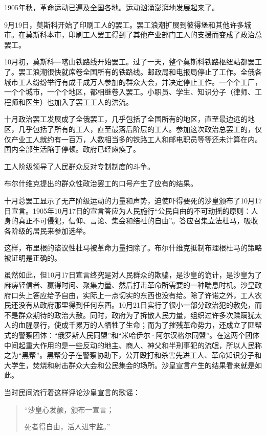 1905年秋，革命运动已遍及全国各地。运动汹涌澎湃地发展起来了。

9月19日，莫斯科开始了印刷工人的罢工。罢工浪潮扩展到彼得堡和其他许多城市。在莫斯科本市，印刷工人罢工得到了其他产业部门工人的支援而变成了政治总罢工。

10月初，莫斯科—喀山铁路线开始罢工。过了一天，整个莫斯科铁路枢纽站都罢工了。罢工浪潮很快就席卷全国所有的铁路线。邮政局和电报局停止了工作。全俄各城市工人纷纷举行有成千成万人参加的群众大会，并决定停止工作。一个个工厂，一个个城市，一个个地区，都相继卷入罢工。小职员、学生、知识分子（律师、工程师和医生）也加入了罢工工人的洪流。

十月政治罢工发展成了全俄罢工，几乎包括了全国所有的地区，直至最边远的地区，几乎包括了所有的工人，直至最落后阶层的工人。参加这次政治总罢工的，仅仅产业工人就约有一百万，人数相当多的铁路工人和邮电职员等等还未计算在内。国内全部生活陷于停顿。政府已经瘫痪了。

工人阶级领导了人民群众反对专制制度的斗争。

布尔什维克提出的群众性政治罢工的口号产生了应有的结果。

十月总罢工显示了无产阶级运动的力量和声势，迫使吓得要死的沙皇颁布了10月17日宣言。1905年10月17日的宣言答应为人民施行“公民自由的不可动摇的原则：人身的真正不可侵犯，信仰、言论、集会和结社的自由”。答应召集立法杜马，吸收各阶级的居民来参加选举。

这样，布里根的谘议性杜马被革命力量扫除了。布尔什维克抵制布理根杜马的策略被证明是正确的。

虽然如此，但10月17日宣言终究是对人民群众的欺骗，是沙皇的诡计，是沙皇为了麻痹轻信者、赢得时问、聚集力量、然后打击革命所需要的一种喘息时机。沙皇政府口头上答应给予自由，实际上一点切实的东西也没有给。除了许诺之外，工人农民还没有从政府那里得到任何东西。10月21日实行了很小一部分政治犯的赦免，而不是群众期待的政治大赦。同时，政府为了拆散人民力量，组织过许多次蹂躏犹太人的血腥暴行，使成千累万的人牺牲了生命；而为了摧残革命势力，还成立了匪帮式的警察团体：“俄罗斯人民同盟”和“米哈伊尔·阿尔汉格尔同盟”。在这两个团体中间起重大作用的是一些反动的地主、商人、神父和半刑事犯的流氓，所以人民称之为“黑帮”。黑帮分子在警察协助下，公开殴打和杀害先进工人、革命知识分子和大学生，焚烧和射击群众大会和公民集会的场所。沙皇宣言产生的结果看来就是如此。

当时民间流行着这样评论沙皇宣言的歌谣：

\begin{quotation}
“沙皇心发颤，颁布一宣言；

死者得自由，活人进牢监。”
\end{quotation}

